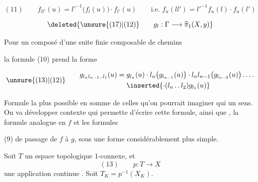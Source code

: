 \[
(11)\qquad f_{ll'}(u)=l'^{-1}\bigl(f_l(u)\bigr)\cdot f_{l'}(u)
\qquad\text{i.e. }f_u(ll')=l'^{-1}f_u(l)\cdot f_u(l')
\]


\[
\deleted{\unsure{(17)|(12)}\qquad g_l:\Gamma\longrightarrow\widehat{\pi}_1(X,y)}
\]


Pour un composé d'une  suite finie composable de chemins


la formule (10) prend la forme

\[
\unsure{(13)|(12)}\qquad
\begin{aligned}
g_{l_nl_{n-1}\mathinner{\ldotp\ldotp}l_1}(u)={}&g_{l_n}(u)\cdot l_n\bigl(g_{l_{n-1}}(u)\bigr)\cdot l_nl_{n-1}\bigl(g_{l_{n-2}}(u)\bigr)\mathinner{\ldotp\ldotp\ldotp\ldotp}\\
&\hfill \inserted{\cdot(l_n\mathinner{\ldotp\ldotp}l_2)g_{l_1}(u)}
\end{aligned}
\]

Formule la plus   possible en somme de celles qu'on pourrait imaginer qui  un sens. On va développer   contexte qui permette  d'écrire cette formule, ainsi que , la formule analogue en $f$ et les formules


(9) de passage de $f$ à $g$, sous une forme considérablement plus simple.

Soit $T$ un espace topologique  $1$-connexe, et
\[
(13)\qquad p:T\longrightarrow X
\]
une application continue . Soit $T_K=p^{-1}(X_K)$.

